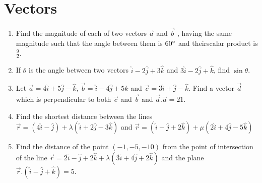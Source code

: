 \documentclass{article}
\providecommand{\brak}[1]{\ensuremath{\left(#1\right)}}
\begin{document}
\section{Vectors}
\begin{enumerate}
\item Find the magnitude of each of two vectors $\vec{a}$ and $\vec{b}$ , having the same magnitude such that the angle  between them is $60\degree{}$ and theirscalar product is $\frac{9}{2}$.
\item If $\theta$ is the angle between two vectors $\hat{i}-2\hat{j}+3\hat{k}$ and $3\hat{i}-2\hat{j}+\hat{k}$, find $\sin\theta$.
\item Let $\vec{a}=4\hat{i}+5\hat{j}-\hat{k}$, $\vec{b}=\hat{i}-4\hat{j}+5\hat{k}$ and $\vec{c}=3\hat{i}+\hat{j}-\hat{k}$. Find a vector $\vec{d}$ which is perpendicular to both $\vec{c}$ and $\vec{b}$ and $\vec{d}.\vec{a}=21$.
\item Find the shortest distance between the lines \\ $\vec{r} = \brak{4\hat{i}-\hat{j}}+\lambda\brak{\hat{i}+2\hat{j}-3\hat{k}}$ and $\vec{r} = \brak{\hat{i}-\hat{j}+2\hat{k}}+ \mu\brak{2\hat{i}+4\hat{j}-5\hat{k}}$
\item Find the distance of the point \brak{-1,-5,-10} from the point of intersection of the line $\vec{r}=2\hat{i}-\hat{j}+2\hat{k}+\lambda{\brak{3\hat{i}+4\hat{j}+2\hat{k}}}$ and the plane $\vec{r}.\brak{\hat{i}-\hat{j}+\hat{k}}=5.$
\end{enumerate}
\end{document}
